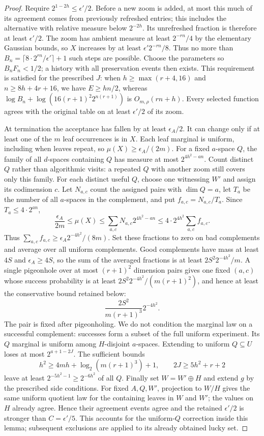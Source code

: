 \begin{proof}
Require $2^{1-2h}\le\epsilon'/2$. Before a new zoom is added, at most
this much of its agreement comes from previously refreshed entries;
this includes the alternative with relative measure below $2^{-2h}$.
Its unrefreshed fraction is therefore at least $\epsilon'/2$.
The zoom has ambient measure at least $2^{-rn}/4$ by the elementary
Gaussian bounds, so $X$ increases by at least
$\epsilon'2^{-rn}/8$. Thus no more than
$B_n=\lceil8\cdot2^{rn}/\epsilon'\rceil+1$ such steps are possible.
Choose the parameters so $B_nF_n<1/2$; a history with all preservation
events then exists. This requirement is satisfied for the prescribed
$J$: when $h\ge\max(r+4,16)$ and $n\ge8h+4r+16$, we have
$E\ge hn/2$, whereas $\log B_n+\log(16(r+1)^2 2^{n(r+1)})$
is $O_{m,\rho}(rn+h)$. Every selected function agrees with the original
table on at least $\epsilon'/2$ of its zoom.

At termination the acceptance has fallen by at least $\epsilon_A/2$.
It can change only if at least one of the $m$ leaf occurrences is in
$X$. Each leaf marginal is uniform, including when leaves repeat,
so $\mu(X)\ge\epsilon_A/(2m)$. For a fixed $a$-space $Q$, the
family of all $d$-spaces containing $Q$ has measure at most
$2^{4h^2-an}$. Count distinct $Q$ rather than algorithmic visits:
a repeated $Q$ with another zoom still covers only this family.
For each distinct useful $Q$, choose one witnessing $W'$ and assign
its codimension $c$. Let $N_{a,c}$ count the assigned pairs with
$\dim Q=a$, let $T_a$ be the number of all $a$-spaces in the complement,
and put $f_{a,c}=N_{a,c}/T_a$. Since $T_a\le4\cdot2^{an}$,
\[
 \frac{\epsilon_A}{2m}\le\mu(X)
 \le\sum_{a,c}N_{a,c}2^{4h^2-an}
 \le4\cdot2^{4h^2}\sum_{a,c}f_{a,c}.
\]
Thus $\sum_{a,c}f_{a,c}\ge\epsilon_A2^{-4h^2}/(8m)$.
Set these fractions to zero on bad complements and average over all
uniform complements. Good complements have mass at least $4S$ and
$\epsilon_A\ge4S$, so the sum of the averaged fractions is at least
$2S^2 2^{-4h^2}/m$. A single pigeonhole over at most $(r+1)^2$
dimension pairs gives one fixed $(a,c)$ whose success probability is
at least $2S^2 2^{-4h^2}/(m(r+1)^2)$, and hence at least the
conservative bound retained below:
\[
 \frac{2S^2}{m(r+1)^3}2^{-4h^2}.
\]
The pair is fixed after pigeonholing. We do not condition the marginal
law on a successful complement: successes form a subset of the full
uniform experiment. Its $Q$ marginal is uniform among $H$-disjoint
$a$-spaces. Extending to uniform $Q\subseteq U$ loses at most
$2^{a+1-2J}$. The sufficient bounds
\[
 h^2\ge4mh+\log_2(m(r+1)^3)+1,\qquad 2J\ge5h^2+r+2
\]
leave at least $2^{-5h^2-1}\ge2^{-6h^2}$ of all $Q$.
Finally set $W=W'\oplus H$ and extend $g$ by the prescribed side
conditions. For fixed $A,Q,W'$, projection to $W/H$ gives the same
uniform quotient law for the containing leaves in $W$ and $W'$;
the values on $H$ already agree. Hence their agreement events agree
and the retained $\epsilon'/2$ is stronger than $C=\epsilon'/5$.
This accounts for the uniform-$Q$ correction inside this lemma;
subsequent exclusions are applied to its already obtained lucky set.
\end{proof}

